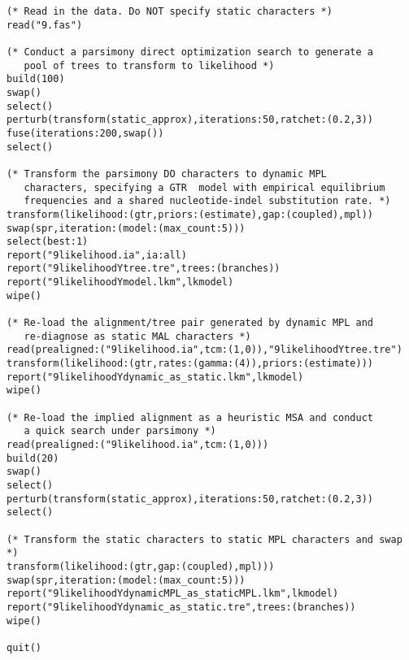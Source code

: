 \begin{verbatim}
(* Read in the data. Do NOT specify static characters *)
read("9.fas")

(* Conduct a parsimony direct optimization search to generate a
   pool of trees to transform to likelihood *)
build(100)
swap()
select()
perturb(transform(static_approx),iterations:50,ratchet:(0.2,3))
fuse(iterations:200,swap())
select()

(* Transform the parsimony DO characters to dynamic MPL
   characters, specifying a GTR  model with empirical equilibrium
   frequencies and a shared nucleotide-indel substitution rate. *)
transform(likelihood:(gtr,priors:(estimate),gap:(coupled),mpl))
swap(spr,iteration:(model:(max_count:5)))
select(best:1)
report("9likelihood.ia",ia:all)
report("9likelihoodYtree.tre",trees:(branches))
report("9likelihoodYmodel.lkm",lkmodel)
wipe()

(* Re-load the alignment/tree pair generated by dynamic MPL and
   re-diagnose as static MAL characters *)
read(prealigned:("9likelihood.ia",tcm:(1,0)),"9likelihoodYtree.tre")
transform(likelihood:(gtr,rates:(gamma:(4)),priors:(estimate)))
report("9likelihoodYdynamic_as_static.lkm",lkmodel)
wipe()

(* Re-load the implied alignment as a heuristic MSA and conduct
   a quick search under parsimony *)
read(prealigned:("9likelihood.ia",tcm:(1,0)))
build(20)
swap()
select()
perturb(transform(static_approx),iterations:50,ratchet:(0.2,3))
select()

(* Transform the static characters to static MPL characters and swap *)
transform(likelihood:(gtr,gap:(coupled),mpl)))
swap(spr,iteration:(model:(max_count:5)))
report("9likelihoodYdynamicMPL_as_staticMPL.lkm",lkmodel)
report("9likelihoodYdynamic_as_static.tre",trees:(branches))
wipe()

quit()
\end{verbatim}

